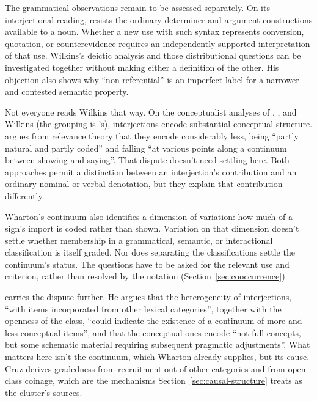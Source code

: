 \documentclass[12pt]{article}
\begin{document}
The grammatical observations remain to be assessed separately. On its interjectional reading,  resists the ordinary determiner and argument constructions available to a noun. Whether a new use with such syntax represents conversion, quotation, or counterevidence requires an independently supported interpretation of that use. Wilkins's deictic analysis and those distributional questions can be investigated together without making either a definition of the other. His objection also shows why \enquote{non-referential} is an imperfect label for a narrower and contested semantic property.

Not everyone reads Wilkins that way. On the conceptualist analyses of \textcite{wierzbicka1992}, \textcite{ameka1992}, and Wilkins (the grouping is \citealp[174]{wharton2000}'s), interjections encode substantial conceptual structure. \textcite[211]{wharton2000} argues from relevance theory that they encode considerably less, being \enquote{partly natural and partly coded} and falling \enquote{at various points along a continuum between showing and saying}. That dispute doesn't need settling here. Both approaches permit a distinction between an interjection's contribution and an ordinary nominal or verbal denotation, but they explain that contribution differently.

Wharton's continuum also identifies a dimension of variation: how much of a sign's import is coded rather than shown. Variation on that dimension doesn't settle whether membership in a grammatical, semantic, or interactional classification is itself graded. Nor does separating the classifications settle the continuum's status. The questions have to be asked for the relevant use and criterion, rather than resolved by the notation (Section~\ref{sec:cooccurrence}).

\textcite[241]{cruz2009} carries the dispute further. He argues that the heterogeneity of interjections, \enquote{with items incorporated from other lexical categories}, together with the openness of the class, \enquote{could indicate the existence of a continuum of more and less conceptual items}, and that the conceptual ones encode \enquote{not full concepts, but some schematic material requiring subsequent pragmatic adjustments}. What matters here isn't the continuum, which Wharton already supplies, but its cause. Cruz derives gradedness from recruitment out of other categories and from open-class coinage, which are the mechanisms Section~\ref{sec:causal-structure} treats as the cluster's sources.
\end{document}
